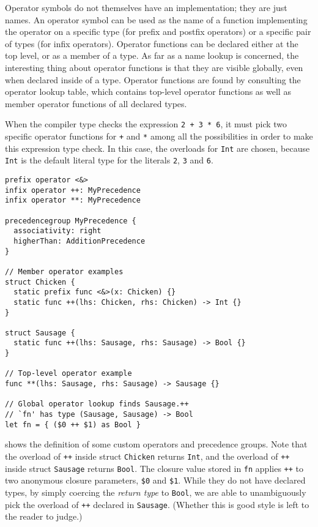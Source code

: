\documentclass[../generics]{subfiles}
\begin{document}
Operator symbols do not themselves have an implementation; they are just names. An operator symbol can be used as the name of a function implementing the operator on a specific type (for prefix and postfix operators) or a specific pair of types (for infix operators). Operator functions can be declared either at the top level, or as a member of a type. As far as a name lookup is concerned, the interesting thing about operator functions is that they are visible globally, even when declared inside of a type. Operator functions are found by consulting the operator lookup table, which contains top-level operator functions as well as member operator functions of all declared types.

When the compiler type checks the expression \texttt{2 + 3 * 6}, it must pick two specific operator functions for \texttt{+} and \texttt{*} among all the possibilities in order to make this expression type check. In this case, the overloads for \texttt{Int} are chosen, because \texttt{Int} is the default literal type for the literals \texttt{2}, \texttt{3} and \texttt{6}.

\begin{listing}\label{customops}
\begin{Verbatim}
prefix operator <&>
infix operator ++: MyPrecedence
infix operator **: MyPrecedence

precedencegroup MyPrecedence {
  associativity: right
  higherThan: AdditionPrecedence
}

// Member operator examples
struct Chicken {
  static prefix func <&>(x: Chicken) {}
  static func ++(lhs: Chicken, rhs: Chicken) -> Int {}
}

struct Sausage {
  static func ++(lhs: Sausage, rhs: Sausage) -> Bool {}
}

// Top-level operator example
func **(lhs: Sausage, rhs: Sausage) -> Sausage {}

// Global operator lookup finds Sausage.++
// `fn' has type (Sausage, Sausage) -> Bool
let fn = { ($0 ++ $1) as Bool }
\end{Verbatim}
\end{listing}
 shows the definition of some custom operators and precedence groups. Note that the overload of \texttt{++} inside struct \texttt{Chicken} returns \texttt{Int}, and the overload of \texttt{++} inside struct \texttt{Sausage} returns \texttt{Bool}. The closure value stored in \texttt{fn} applies \texttt{++} to two anonymous closure parameters, \verb|$0| and \verb|$1|. While they do not have declared types, by simply coercing the \emph{return type} to \texttt{Bool}, we are able to unambiguously pick the overload of \texttt{++} declared in \texttt{Sausage}. (Whether this is good style is left to the reader to judge.)
\end{document}
